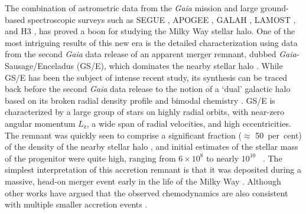 The combination of astrometric data from the \textit{Gaia} mission \parencite{gaia} and large ground-based spectroscopic surveys such as SEGUE \parencite{segue}, APOGEE \parencite{apogee}, GALAH \parencite{galah}, LAMOST \parencite{lamost}, and H3 \parencite{h3}, has proved a boon for studying the Milky Way stellar halo. One of the most intriguing results of this new era is the detailed characterization using data from the second \textit{Gaia} data release of an apparent merger remnant, dubbed \textit{Gaia}-Sausage/Enceladus (GS/E), which dominates the nearby stellar halo \parencite{belokurov18,haywood18,helmi18}. While GS/E has been the subject of intense recent study, its synthesis can be traced back before the second \textit{Gaia} data release to the notion of a `dual' galactic halo based on its broken radial density profile and bimodal chemistry \parencite[e.g.][]{carollo07,nissen10,deason11,bonaca17,hayes18}. GS/E is characterized by a large group of stars on highly radial orbits, with near-zero angular momentum $L_\mathrm{z}$, a wide span of radial velocities, and high eccentricities. The remnant was quickly seen to comprise a significant fraction ($\approx$ 50~per~cent) of the density of the nearby stellar halo \parencite{belokurov18,fattahi19,lancaster19}, and initial estimates of the stellar mass of the progenitor were quite high, ranging from $6\times10^{8}$ to nearly $10^{10}$ \Msun\ \parencite{helmi18,belokurov18,vincenzo19,feuillet20,fattahi19,myeong19,das20}. The simplest interpretation of this accretion remnant is that it was deposited during a massive, head-on merger event early in the life of the Milky Way \parencite{helmi18,belokurov18,iorio19,deason19,fattahi19,mackereth19a}. Although other works have argued that the observed chemodynamics are also consistent with multiple smaller accretion events \parencite{donlon22,donlon23}.

